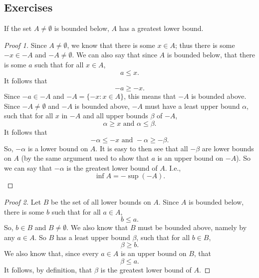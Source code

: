 \subsection{Exercises}
\begin{problem}[8-2]
\begin{theorem}
If the set $A \ne \emptyset$ is bounded below, $A$ has a greatest lower bound.

\begin{proof}[Proof 1]
Since $A \ne \emptyset$, we know that there is some $x \in A$; thus there is some $-x \in -A$ and $-A \ne \emptyset$. We can also say that since $A$ is bounded below, that there is some $a$ such that for all $x \in A$,
\[ a \le x. \]
It follows that 
\[ -a \ge -x. \]
Since $-a \in -A$ and $-A = \{-x: x \in A\}$, this means that $-A$ is bounded above. Since $-A \ne \emptyset$ and $-A$ is bounded above, $-A$ must have a least upper bound $\alpha$, such that for all $x$ in $-A$ and all upper bounds $\beta$ of $-A$,
\[ \alpha \ge x \textrm{ and } \alpha \le \beta. \]
It follows that
\[ -\alpha \le -x \textrm{ and } -\alpha \ge -\beta. \]
So, $-\alpha$ is a lower bound on $A$. It is easy to then see that all $-\beta$ are lower bounds on $A$ (by the same argument used to show that $a$ is an upper bound on $-A$). So we can say that $-\alpha$ is the greatest lower bound of $A$. I.e.,
\[ \inf A = - \sup (-A). \]
\end{proof}

\begin{proof}[Proof 2]
Let $B$ be the set of all lower bounds on $A$. Since $A$ is bounded below, there is some $b$ such that for all $a \in A$,
\[ b \le a. \]
So, $b \in B$ and $B \ne \emptyset$. We also know that $B$ must be bounded above, namely by any $a \in A$. So $B$ has a least upper bound $\beta$, such that for all $b \in B$,
\[ \beta \ge b. \]
We also know that, since every $a \in A$ is an upper bound on $B$, that
\[ \beta \le a. \]
It follows, by definition, that $\beta$ is the greatest lower bound of $A$.
\end{proof}

\end{theorem}
\end{problem}

